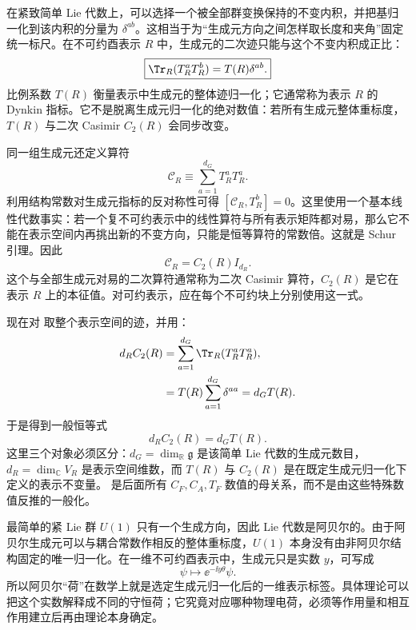 在紧致简单 Lie 代数上，可以选择一个被全部群变换保持的不变内积，并把基归一化到该内积的分量为 $\delta^{ab}$。这相当于为“生成元方向之间怎样取长度和夹角”固定统一标尺。在不可约酉表示 $R$ 中，生成元的二次迹只能与这个不变内积成正比：
\begin{equation}
 \boxed{
 \Tr_R(T_R^aT_R^b)=T(R)\delta^{ab}.}
 \label{eq:dynkin-index-dp11}
\end{equation}
比例系数 $T(R)$ 衡量表示中生成元的整体迹归一化；它通常称为表示 $R$ 的 Dynkin 指标。它不是脱离生成元归一化的绝对数值：若所有生成元整体重标度，$T(R)$ 与二次 Casimir $C_2(R)$ 会同步改变。

同一组生成元还定义算符
\begin{equation}
 \mathcal C_R\equiv\sum_{a=1}^{d_G}T_R^aT_R^a.
 \label{eq:quadratic-invariant-operator-dp68}
\end{equation}
利用结构常数对生成元指标的反对称性可得 $[\mathcal C_R,T_R^b]=0$。这里使用一个基本线性代数事实：若一个复不可约表示中的线性算符与所有表示矩阵都对易，那么它不能在表示空间内再挑出新的不变方向，只能是恒等算符的常数倍。这就是 Schur 引理。因此
\begin{equation}
 \boxed{
 \mathcal C_R=C_2(R)I_{d_R}.}
 \label{eq:casimir-general-rep-dp11}
\end{equation}
这个与全部生成元对易的二次算符通常称为二次 Casimir 算符，$C_2(R)$ 是它在表示 $R$ 上的本征值。对可约表示，应在每个不可约块上分别使用这一式。

现在对 取整个表示空间的迹，并用：
\begin{align}
 d_RC_2(R)
 &=\sum_{a=1}^{d_G}\Tr_R(T_R^aT_R^a),\\
 &=T(R)\sum_{a=1}^{d_G}\delta^{aa}
 =d_GT(R).
\end{align}
于是得到一般恒等式
\begin{equation}
 \boxed{d_RC_2(R)=d_GT(R).}
 \label{eq:casimir-dynkin-relation-dp11}
\end{equation}
这里三个对象必须区分：$d_G=\dim_{\mathbb R}\mathfrak g$ 是该简单 Lie 代数的生成元数目，$d_R=\dim_{\mathbb C}V_R$ 是表示空间维数，而 $T(R)$ 与 $C_2(R)$ 是在既定生成元归一化下定义的表示不变量。 是后面所有 $C_F,C_A,T_F$ 数值的母关系，而不是由这些特殊数值反推的一般化。

最简单的紧 Lie 群 $U(1)$ 只有一个生成方向，因此 Lie 代数是阿贝尔的。由于阿贝尔生成元可以与耦合常数作相反的整体重标度，$U(1)$ 本身没有由非阿贝尔结构固定的唯一归一化。在一维不可约酉表示中，生成元只是实数 $y$，可写成
\begin{equation}
 \psi\longmapsto \ee^{-\ii y\theta}\psi.
 \label{eq:u1-charge-rep-dp11}
\end{equation}
所以阿贝尔“荷”在数学上就是选定生成元归一化后的一维表示标签。具体理论可以把这个实数解释成不同的守恒荷；它究竟对应哪种物理电荷，必须等作用量和相互作用建立后再由理论本身确定。


